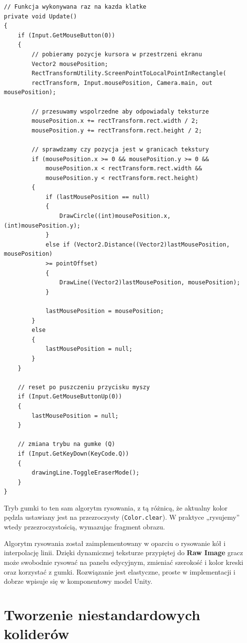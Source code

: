 \documentclass[a4paper,12pt]{book} %
\begin{document}
\begin{lstlisting}[language=CSharp, caption={Fragment metody Update}, label={lst:update}]
// Funkcja wykonywana raz na kazda klatke
private void Update()
{
    if (Input.GetMouseButton(0))
    {
        // pobieramy pozycje kursora w przestrzeni ekranu
        Vector2 mousePosition;
        RectTransformUtility.ScreenPointToLocalPointInRectangle(
        rectTransform, Input.mousePosition, Camera.main, out mousePosition);

        // przesuwamy wspolrzedne aby odpowiadaly teksturze
        mousePosition.x += rectTransform.rect.width / 2;
        mousePosition.y += rectTransform.rect.height / 2;

        // sprawdzamy czy pozycja jest w granicach tekstury
        if (mousePosition.x >= 0 && mousePosition.y >= 0 &&
            mousePosition.x < rectTransform.rect.width &&
            mousePosition.y < rectTransform.rect.height)
        {
            if (lastMousePosition == null)
            {
                DrawCircle((int)mousePosition.x, (int)mousePosition.y);
            }
            else if (Vector2.Distance((Vector2)lastMousePosition, mousePosition)
            >= pointOffset)
            {
                DrawLine((Vector2)lastMousePosition, mousePosition);
            }
            
            lastMousePosition = mousePosition;
        }
        else
        {
            lastMousePosition = null;
        }
    }

    // reset po puszczeniu przycisku myszy
    if (Input.GetMouseButtonUp(0))
    {
        lastMousePosition = null;
    }

    // zmiana trybu na gumke (Q)
    if (Input.GetKeyDown(KeyCode.Q))
    {
        drawingLine.ToggleEraserMode();
    }
}
\end{lstlisting}

Tryb gumki to ten sam algorytm rysowania, z tą różnicą, że aktualny kolor pędzla ustawiany jest na przezroczysty (\texttt{Color.clear}). 
W praktyce „rysujemy” wtedy przezroczystością, wymazując fragment obrazu.

Algorytm rysowania został zaimplementowany w oparciu o rysowanie kół i interpolację linii. 
Dzięki dynamicznej teksturze przypiętej do \textbf{Raw Image} gracz może swobodnie rysować na panelu edycyjnym, 
zmieniać szerokość i kolor kreski oraz korzystać z gumki. 
Rozwiązanie jest elastyczne, proste w implementacji i dobrze wpisuje się w komponentowy model Unity.

\section{Tworzenie niestandardowych koliderów}
\end{document}
